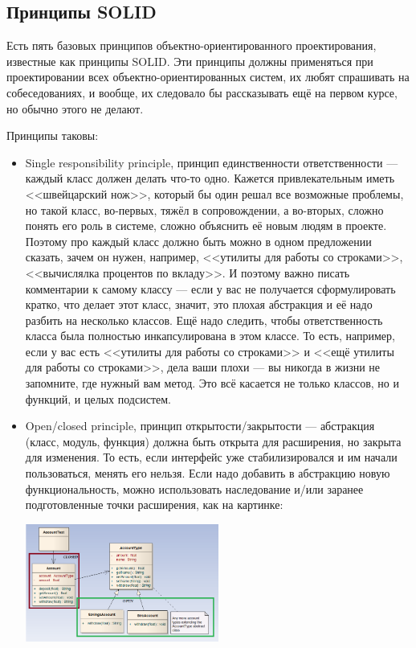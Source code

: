\documentclass{../../text-style}
\begin{document}
\subsection{Принципы SOLID}

Есть пять базовых принципов объектно-ориентированного проектирования, известные как принципы SOLID. Эти принципы должны применяться при проектировании всех объектно-ориентированных систем, их любят спрашивать на собеседованиях, и вообще, их следовало бы рассказывать ещё на первом курсе, но обычно этого не делают.

Принципы таковы:

\begin{itemize}
    \item Single responsibility principle, принцип единственности ответственности --- каждый класс должен делать что-то одно. Кажется привлекательным иметь <<швейцарский нож>>, который бы один решал все возможные проблемы, но такой класс, во-первых, тяжёл в сопровождении, а во-вторых, сложно понять его роль в системе, сложно объяснить её новым людям в проекте. Поэтому про каждый класс должно быть можно в одном предложении сказать, зачем он нужен, например, <<утилиты для работы со строками>>, <<вычислялка процентов по вкладу>>. И поэтому важно писать комментарии к самому классу --- если у вас не получается сформулировать кратко, что делает этот класс, значит, это плохая абстракция и её надо разбить на несколько классов. Ещё надо следить, чтобы ответственность класса была полностью инкапсулирована в этом классе. То есть, например, если у вас есть <<утилиты для работы со строками>> и <<ещё утилиты для работы со строками>>, дела ваши плохи --- вы никогда в жизни не запомните, где нужный вам метод. Это всё касается не только классов, но и функций, и целых подсистем.
    \item Open/closed principle, принцип открытости/закрытости --- абстракция (класс, модуль, функция) должна быть открыта для расширения, но закрыта для изменения. То есть, если интерфейс уже стабилизировался и им начали пользоваться, менять его нельзя. Если надо добавить в абстракцию новую функциональность, можно использовать наследование и/или заранее подготовленные точки расширения, как на картинке:
        \begin{center}
            \includegraphics[width=0.5\textwidth]{openClosedPrinciple.png}
        \end{center}


\end{itemize}
\end{document}
